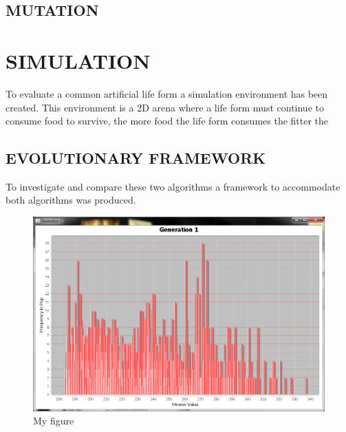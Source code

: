 \documentclass[10pt,twocolumn]{article}
\begin{document}
\subsection{MUTATION}



\section{SIMULATION}
To evaluate a common artificial life form a simulation environment has been created. This environment is a 2D arena where a life form must continue to consume food to survive, the more food the life form consumes the fitter the  



\subsection{EVOLUTIONARY FRAMEWORK}
To investigate and compare these two algorithms %
a framework to accommodate both algorithms was produced.  



\begin{figure} [ht]
\centering
\includegraphics[scale = 0.25]{gen1-2500.png}
\caption{My figure}
\label{the-label-for-cross-referencing}
\end{figure}




\end{document}
